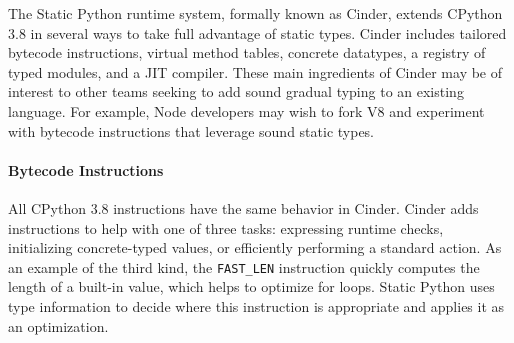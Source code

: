 \documentclass[english,cleveref,submission]{programming}
\newcommand{\SP}{Static Python}
\newcommand{\code}[1]{\texttt{#1}}
\begin{document}

The \SP{} runtime system, formally known as Cinder, extends
CPython 3.8 in several ways to take full advantage of static types.
Cinder includes tailored bytecode instructions, virtual method tables,
concrete datatypes, a registry of typed modules, and a JIT compiler.
These main ingredients of Cinder may be of interest to other teams seeking to
add sound gradual typing to an existing language.
For example, Node developers may wish to fork V8 and experiment with
bytecode instructions that leverage sound static types.


\paragraph{Bytecode Instructions}

All CPython 3.8 instructions have the same behavior in Cinder.
Cinder adds instructions to help with one of three tasks:
expressing runtime checks,
initializing concrete-typed values,
or efficiently performing a standard action.
As an example of the third kind, the \code{FAST\_LEN} instruction quickly
computes the length of a built-in value, which helps to optimize for loops.
\SP{} uses type information to decide where this instruction is appropriate
and applies it as an optimization.

\end{document}
